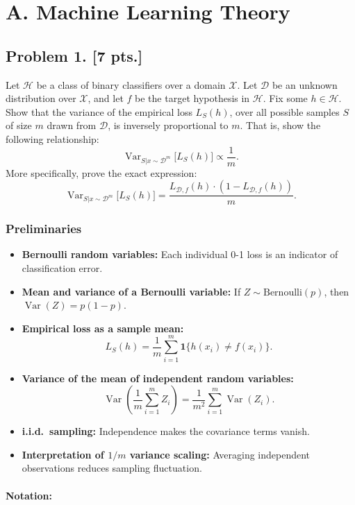 \documentclass[11pt,a4paper]{article}
\DeclareMathOperator{\Var}{Var}
\theoremstyle{definition}
\begin{document}
\section{A. Machine Learning Theory}

\subsection{Problem 1. [7 pts.]}
Let $\mathcal{H}$ be a class of binary classifiers over a domain $\mathcal{X}$. Let $\mathcal{D}$ be an unknown distribution over $\mathcal{X}$, and let $f$ be the target hypothesis in $\mathcal{H}$. Fix some $h \in \mathcal{H}$. Show that the variance of the empirical loss $L_S(h)$, over all possible samples $S$ of size $m$ drawn from $\mathcal{D}$, is inversely proportional to $m$. That is, show the following relationship:
\[
\Var_{S | x \sim \mathcal{D}^m} \bigl[ L_S(h) \bigr] \propto \frac{1}{m}.
\]
More specifically, prove the exact expression:
\[
\Var_{S | x \sim \mathcal{D}^m} \bigl[ L_S(h) \bigr] = \frac{L_{\mathcal{D}, f}(h) \cdot (1 - L_{\mathcal{D}, f}(h))}{m}.
\]

\subsubsection{Preliminaries}

\begin{itemize}
    \item \textbf{Bernoulli random variables:} Each individual 0-1 loss is an indicator of classification error.
    \item \textbf{Mean and variance of a Bernoulli variable:} If $Z \sim \text{Bernoulli}(p)$, then $\Var(Z) = p(1 - p)$.
    \item \textbf{Empirical loss as a sample mean:}
    \[
    L_S(h) = \frac{1}{m} \sum_{i=1}^{m} \mathbf{1}\{h(x_i) \neq f(x_i)\}.
    \]
    \item \textbf{Variance of the mean of independent random variables:}
    \[
    \Var\left(\frac{1}{m} \sum_{i=1}^{m} Z_i\right) = \frac{1}{m^2} \sum_{i=1}^{m} \Var(Z_i).
    \]
    \item \textbf{i.i.d.~sampling:} Independence makes the covariance terms vanish.
    \item \textbf{Interpretation of $1/m$ variance scaling:} Averaging independent observations reduces sampling fluctuation.
\end{itemize}

\paragraph{Notation:}\label{para:notation}
\end{document}
